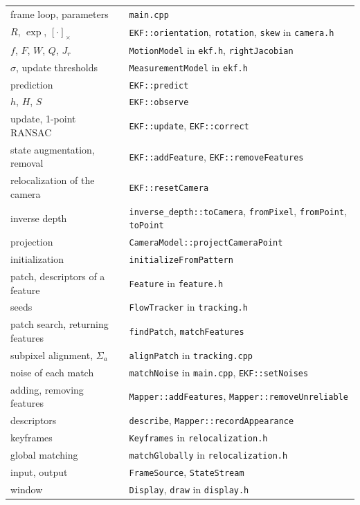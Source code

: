 \documentclass[11pt]{article}
\begin{document}
\begin{center}
\small
\begin{tabular}{ll}
  frame loop, parameters & \texttt{main.cpp} \\
  $R$, $\exp$, $[\cdot]_\times$ & \texttt{EKF::orientation}, \texttt{rotation}, \texttt{skew} in \texttt{camera.h} \\
  $f$, $F$, $W$, $Q$, $J_r$ & \texttt{MotionModel} in \texttt{ekf.h}, \texttt{rightJacobian} \\
  $\sigma$, update thresholds & \texttt{MeasurementModel} in \texttt{ekf.h} \\
  prediction & \texttt{EKF::predict} \\
  $h$, $H$, $S$ & \texttt{EKF::observe} \\
  update, 1-point RANSAC & \texttt{EKF::update}, \texttt{EKF::correct} \\
  state augmentation, removal & \texttt{EKF::addFeature}, \texttt{EKF::removeFeatures} \\
  relocalization of the camera & \texttt{EKF::resetCamera} \\
  inverse depth & \texttt{inverse\_depth::toCamera}, \texttt{fromPixel}, \texttt{fromPoint}, \texttt{toPoint} \\
  projection & \texttt{CameraModel::projectCameraPoint} \\
  initialization & \texttt{initializeFromPattern} \\
  patch, descriptors of a feature & \texttt{Feature} in \texttt{feature.h} \\
  seeds & \texttt{FlowTracker} in \texttt{tracking.h} \\
  patch search, returning features & \texttt{findPatch}, \texttt{matchFeatures} \\
  subpixel alignment, $\Sigma_a$ & \texttt{alignPatch} in \texttt{tracking.cpp} \\
  noise of each match & \texttt{matchNoise} in \texttt{main.cpp}, \texttt{EKF::setNoises} \\
  adding, removing features & \texttt{Mapper::addFeatures}, \texttt{Mapper::removeUnreliable} \\
  descriptors & \texttt{describe}, \texttt{Mapper::recordAppearance} \\
  keyframes & \texttt{Keyframes} in \texttt{relocalization.h} \\
  global matching & \texttt{matchGlobally} in \texttt{relocalization.h} \\
  input, output & \texttt{FrameSource}, \texttt{StateStream} \\
  window & \texttt{Display}, \texttt{draw} in \texttt{display.h} \\
\end{tabular}
\end{center}
\end{document}
